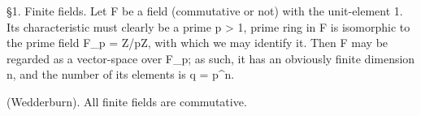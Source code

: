 
  \S 1. Finite fields. Let F be a field (commutative or not) with the
unit-element 1. Its characteristic must clearly be a prime p > 1, 
prime ring in F is isomorphic to the prime field \mathbf F_p = \mathbf Z/p\mathbf Z, with 
which we may identify it. Then F may be regarded as a vector-space over \mathbf F_p;  
as such, it has an obviously finite dimension n, and the number of its 
elements is q = p^n. 

\theorem (Wedderburn). All finite fields are commutative. 

